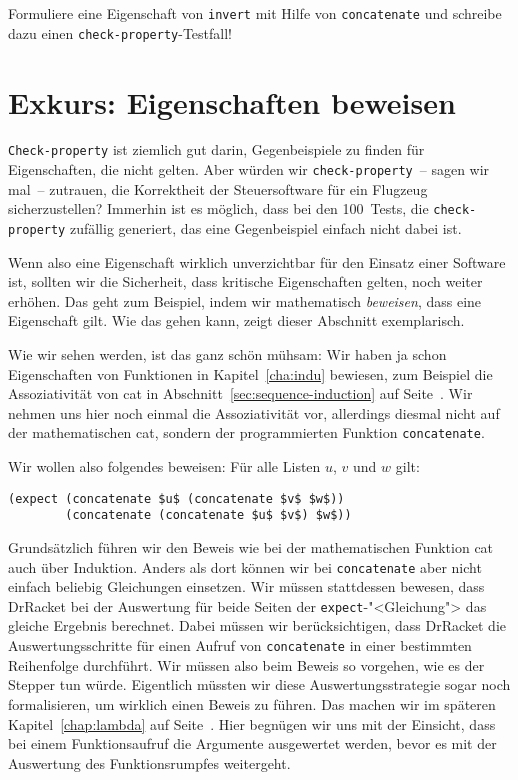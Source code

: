 \begin{aufgabeinline}
  Formuliere eine Eigenschaft von \lstinline{invert} mit Hilfe von
  \lstinline{concatenate} und schreibe dazu einen
  \lstinline{check-property}-Testfall!
\end{aufgabeinline}

\section{Exkurs: Eigenschaften beweisen}
\label{sec:eigenschaften-beweisen}

\lstinline{Check-property} ist ziemlich gut darin, Gegenbeispiele zu
finden für Eigenschaften, die nicht gelten.  Aber würden wir
\lstinline{check-property}~-- sagen wir mal~-- zutrauen, die
Korrektheit der Steuersoftware für ein Flugzeug sicherzustellen?  
Immerhin ist es möglich, dass bei den 100~Tests, die
\lstinline{check-property} zufällig generiert, das eine Gegenbeispiel
einfach nicht dabei ist.  

Wenn also eine Eigenschaft wirklich unverzichtbar für den Einsatz
einer Software ist, sollten wir die Sicherheit, dass kritische
Eigenschaften gelten, noch weiter erhöhen.  Das geht zum Beispiel,
indem wir mathematisch \emph{beweisen}, dass eine Eigenschaft gilt.
Wie das gehen kann, zeigt dieser Abschnitt exemplarisch.  

Wie wir sehen werden, ist das ganz schön mühsam: Wir haben ja schon
Eigenschaften von Funktionen in Kapitel~\ref{cha:indu} bewiesen, zum
Beispiel die Assoziativität von cat in
Abschnitt~\ref{sec:sequence-induction} auf
Seite~\pageref{sec:sequence-induction}.  Wir nehmen uns hier noch
einmal die Assoziativität vor, allerdings diesmal nicht auf der
mathematischen cat, sondern der programmierten Funktion
\lstinline{concatenate}.  

Wir wollen also folgendes beweisen: Für alle Listen $u$, $v$ und $w$ gilt:
%
\begin{lstlisting}
(expect (concatenate $u$ (concatenate $v$ $w$))
        (concatenate (concatenate $u$ $v$) $w$))
\end{lstlisting}
%
Grundsätzlich führen wir den Beweis wie bei der mathematischen
Funktion cat auch über Induktion.  Anders als dort können wir bei
\lstinline{concatenate} aber nicht einfach beliebig Gleichungen
einsetzen.  Wir müssen stattdessen bewesen, dass DrRacket bei der
Auswertung für beide Seiten der \lstinline{expect}-"<Gleichung"> das
gleiche Ergebnis berechnet.  Dabei müssen wir berücksichtigen, dass
DrRacket die Auswertungsschritte für einen Aufruf von
\lstinline{concatenate} in einer bestimmten Reihenfolge durchführt.
Wir müssen also beim Beweis so vorgehen, wie es der Stepper tun würde.
Eigentlich müssten wir diese Auswertungsstrategie sogar noch
formalisieren, um wirklich einen Beweis zu führen.  Das machen wir im
späteren Kapitel~\ref{chap:lambda} auf Seite~\pageref{chap:lambda}.
Hier begnügen wir uns mit der Einsicht, dass bei einem Funktionsaufruf
die Argumente ausgewertet werden, bevor es mit der Auswertung des
Funktionsrumpfes weitergeht.

